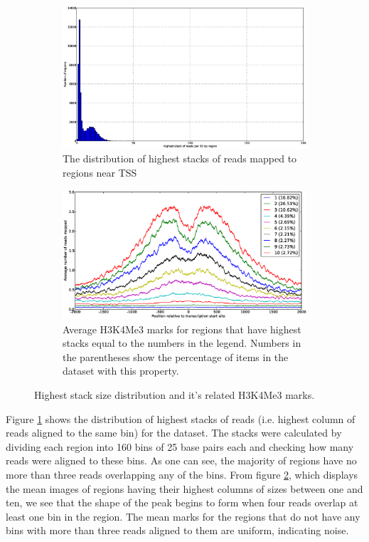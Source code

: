 \documentclass[10pt,a4paper]{article}
\begin{document}
\begin{figure}
\centering
\begin{subfigure}{0.4\textwidth}
   \includegraphics[width=\textwidth]{images/highest_stack.eps}
   \caption{The distribution of highest stacks of reads mapped to regions near TSS}
   \label{fig:highest_stack_distribution}
\end{subfigure}
\begin{subfigure}{0.59\textwidth}
    \includegraphics[width=\textwidth]{images/highest_stack_dist_average_marks2.eps}
    \caption{Average H3K4Me3 marks for regions that have highest stacks equal to the numbers in the legend. Numbers in the parentheses show the percentage of items in the dataset with this property.}
    \label{fig:highest_stack_mean_marks}
\end{subfigure}
\caption{Highest stack size distribution and it's related H3K4Me3 marks.}
\label{fig:highest_stacks}
\end{figure}

Figure \ref{fig:highest_stack_distribution} shows the distribution of highest stacks of reads  (i.e. highest column of reads aligned to the same bin) for the dataset. The stacks were calculated by dividing each region into 160 bins of 25 base pairs each and checking how many reads were aligned to these bins. As one can see, the majority of regions have no more than three reads overlapping any of the bins. From figure \ref{fig:highest_stack_mean_marks}, which displays the mean images of regions having their highest columns of sizes between one and ten, we see that the shape of the peak begins to form when four reads overlap at least one bin in the region. The mean marks for the regions that do not have any bins with more than three reads aligned to them are uniform, indicating noise.
\end{document}
